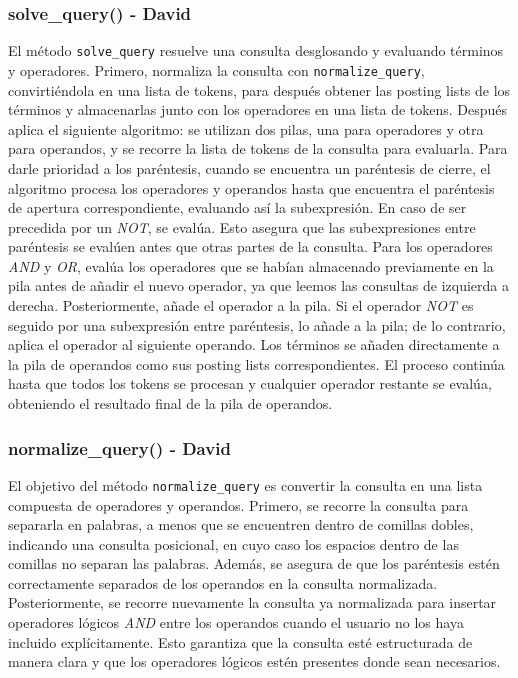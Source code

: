 \documentclass[12pt,a4paper]{article}
\begin{document}
\subsubsection{solve\_query() - David}
El método \texttt{solve\_query} resuelve una consulta desglosando y evaluando términos y operadores. Primero, normaliza la consulta con \texttt{normalize\_query}, convirtiéndola en una lista de tokens, para después obtener las posting lists de los términos y almacenarlas junto con los operadores en una lista de tokens.
Después aplica el siguiente algoritmo: se utilizan dos pilas, una para operadores y otra para operandos, y se recorre la lista de tokens de la consulta para evaluarla. Para darle prioridad a los paréntesis, cuando se encuentra un paréntesis de cierre, el algoritmo procesa los operadores y operandos hasta que encuentra el paréntesis de apertura correspondiente, evaluando así la subexpresión. En caso de ser precedida por un \textit{NOT}, se evalúa. Esto asegura que las subexpresiones entre paréntesis se evalúen antes que otras partes de la consulta. Para los operadores \textit{AND} y \textit{OR}, evalúa los operadores que se habían almacenado previamente en la pila antes de añadir el nuevo operador, ya que leemos las consultas de izquierda a derecha. Posteriormente, añade el operador a la pila. Si el operador \textit{NOT} es seguido por una subexpresión entre paréntesis, lo añade a la pila; de lo contrario, aplica el operador al siguiente operando. Los términos se añaden directamente a la pila de operandos como sus posting lists correspondientes. El proceso continúa hasta que todos los tokens se procesan y cualquier operador restante se evalúa, obteniendo el resultado final de la pila de operandos.

\subsubsection{normalize\_query() - David}
El objetivo del método \texttt{normalize\_query} es convertir la consulta en una lista compuesta de operadores y operandos. Primero, se recorre la consulta para separarla en palabras, a menos que se encuentren dentro de comillas dobles, indicando una consulta posicional, en cuyo caso los espacios dentro de las comillas no separan las palabras. Además, se asegura de que los paréntesis estén correctamente separados de los operandos en la consulta normalizada. Posteriormente, se recorre nuevamente la consulta ya normalizada para insertar operadores lógicos \textit{AND} entre los operandos cuando el usuario no los haya incluido explícitamente. Esto garantiza que la consulta esté estructurada de manera clara y que los operadores lógicos estén presentes donde sean necesarios.
\end{document}
